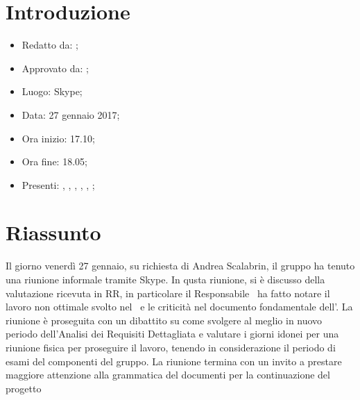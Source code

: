 \section{Introduzione}

	\begin{itemize}
		\item Redatto da: \MC;
		\item Approvato da: \AS;
		\item Luogo: Skype;
		\item Data: 27 gennaio 2017;
		\item Ora inizio: 17.10;
		\item Ora fine: 18.05;
		\item Presenti: \AS, \DS, \MC, \NS, \DAN, \AN;		
	\end{itemize}

\section{Riassunto}
Il giorno venerdì 27 gennaio, su richiesta di Andrea Scalabrin, il gruppo ha tenuto una riunione informale tramite Skype. In qusta riunione, si è discusso della valutazione ricevuta in RR, in particolare il Responsabile \AS\ ha fatto notare il lavoro non ottimale svolto nel \PdQ\ e le criticità nel documento fondamentale dell'\AdR. La riunione è proseguita con un dibattito su come svolgere al meglio in nuovo periodo dell'Analisi dei Requisiti Dettagliata e valutare i giorni idonei per una riunione fisica per proseguire il lavoro, tenendo in considerazione il periodo di esami del componenti del gruppo. La riunione termina con un invito a prestare maggiore attenzione alla grammatica del documenti per la continuazione del progetto
